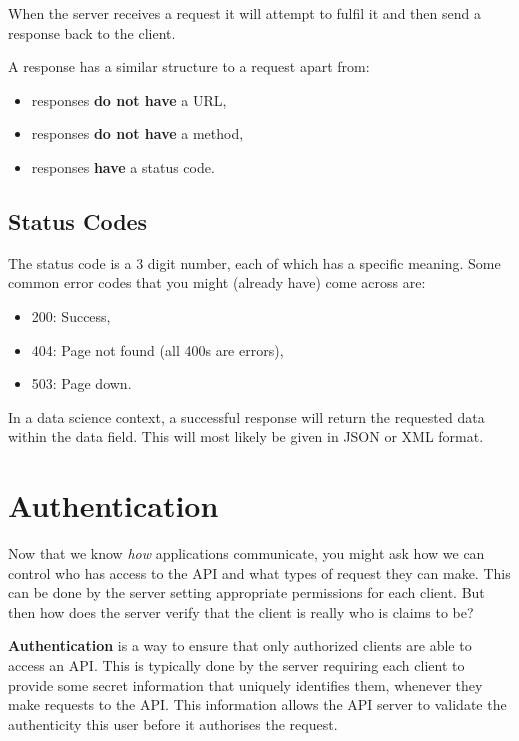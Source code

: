 \documentclass[
  12pt,
]{book}
\providecommand{\tightlist}{%
  \setlength{\itemsep}{0pt}\setlength{\parskip}{0pt}}
\begin{document}
When the server receives a request it will attempt to fulfil it and then send a response back to the client.

A response has a similar structure to a request apart from:

\begin{itemize}
\tightlist
\item
  responses \textbf{do not have} a URL,
\item
  responses \textbf{do not have} a method,
\item
  responses \textbf{have} a status code.
\end{itemize}

\hypertarget{status-codes}{%
\subsection{Status Codes}\label{status-codes}}

The status code is a 3 digit number, each of which has a specific meaning. Some common error codes that you might (already have) come across are:

\begin{itemize}
\tightlist
\item
  200: Success,
\item
  404: Page not found (all 400s are errors),
\item
  503: Page down.
\end{itemize}

In a data science context, a successful response will return the requested data within the data field. This will most likely be given in JSON or XML format.

\hypertarget{authentication}{%
\section{Authentication}\label{authentication}}

Now that we know \emph{how} applications communicate, you might ask how we can control who has access to the API and what types of request they can make. This can be done by the server setting appropriate permissions for each client. But then how does the server verify that the client is really who is claims to be?

\textbf{Authentication} is a way to ensure that only authorized clients are able to access an API. This is typically done by the server requiring each client to provide some secret information that uniquely identifies them, whenever they make requests to the API. This information allows the API server to validate the authenticity this user before it authorises the request.
\end{document}
